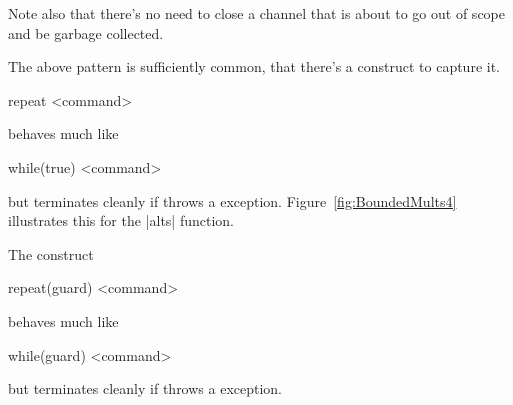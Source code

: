Note also that there's no need to close a channel that is about to go out of
scope and be garbage collected. 

The above pattern is sufficiently common, that there's a construct to capture
it.
%
\begin{scala}
  repeat{ <command> }
\end{scala}
%
behaves much like
\begin{scala}
  while(true){ <command> }
\end{scala}
but terminates cleanly if  throws a 
exception.
Figure~\ref{fig:BoundedMults4} illustrates this for the |alts| function.


The construct
%
\begin{scala}
  repeat(guard){ <command> }
\end{scala}
%
behaves much like
\begin{scala}
  while(guard){ <command> }
\end{scala}
but terminates cleanly if  throws a 
exception.


